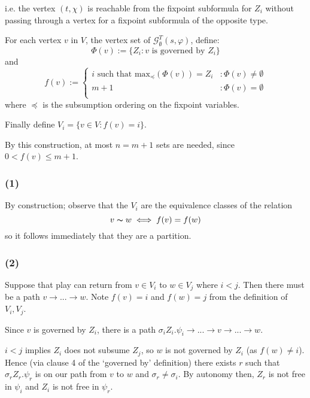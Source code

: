 \documentclass[11pt]{article}
\begin{document}
i.e. the vertex $(t, \chi)$ is reachable from the fixpoint subformula for $Z_i$
without passing through a vertex for a fixpoint subformula of the opposite
type.

For each vertex $v$ in $V$, the vertex set of $\mathcal{G}^T_{\emptyset}(s,\varphi)$, define:
\begin{displaymath}
   \Phi(v) := \{ Z_i : v \text{ is governed by } Z_i \}
\end{displaymath}
and 
\begin{displaymath}
   f(v) := \left\{
     \begin{array}{lr}
        i \text{ such that max}_{\preceq}(\Phi(v)) = Z_i & : \Phi(v) \neq \emptyset  \\
        m+1 & : \Phi(v) = \emptyset  \\
     \end{array}
   \right.
\end{displaymath} 
where $\preceq$ is the subsumption ordering on the fixpoint variables.

Finally define $V_i = \{ v \in V : f(v) = i \}$.

By this construction, at most $n = m+1$ sets are needed, since $0 < f(v) \leq m+1$.

\subsubsection*{(1)}

By construction; observe that the $V_i$ are the equivalence classes of the relation 
\begin{displaymath}
v \thicksim w \iff f(v) = f(w)
\end{displaymath}
so it follows immediately that they are a partition.

\subsubsection*{(2)}

Suppose that play can return from $v \in V_i$ to $w \in V_j$ where $i < j$. Then there must be a path $v \rightarrow ... \rightarrow  w$.
Note $f(v) = i$ and $f(w) = j$ from the definition of $V_i, V_j$. 

Since $v$ is governed by $Z_i$, there is a path $\sigma_i Z_i . \psi_i
\rightarrow ... \rightarrow v \rightarrow ...  \rightarrow w$.

$i < j$ implies $Z_i$ does not subsume $Z_j$, so $w$ is not governed by $Z_i$
(as $f(w) \neq i$). Hence (via clause 4 of the `governed by' definition) there
exists $r$ such that $\sigma_r Z_r. \psi_r$ is on our path from $v$ to $w$ and
$\sigma_r \neq \sigma_i$. By autonomy then, $Z_r$ is not free in $\psi_i$ and
$Z_i$ is not free in $\psi_r$.
\end{document}
